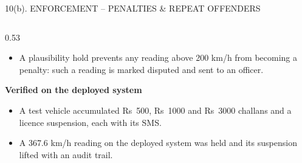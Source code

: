 \documentclass[aspectratio=169,10pt,t]{beamer}
\newcommand{\hd}[1]{{\color{dsblue}\textbf{#1}}}          %
\begin{document}
\begin{frame}{10(b). ENFORCEMENT -- PENALTIES \& REPEAT OFFENDERS}
\begin{columns}[T,onlytextwidth]
\begin{column}{0.53\textwidth}
\begin{itemize}
        Vahan/RC lookup can be attached without code change.
  \item A plausibility hold prevents any reading above 200 km/h from becoming a penalty: such a reading is marked
        disputed and sent to an officer.
\end{itemize}
\hd{\small Verified on the deployed system}
\begin{itemize}\setlength{\itemsep}{0.15em}
  \item A test vehicle accumulated Rs~500, Rs~1000 and Rs~3000 challans and a licence suspension, each with its SMS.
  \item A 367.6 km/h reading on the deployed system was held and its suspension lifted with an audit trail.
\end{itemize}
\end{column}
\end{columns}
\end{frame}
\end{document}
